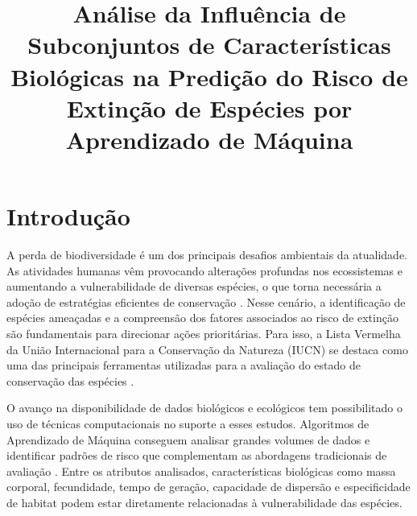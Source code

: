 \documentclass[conference]{IEEEtran}
\begin{document}
\title{Análise da Influência de Subconjuntos de Características Biológicas na Predição do Risco de Extinção de Espécies por Aprendizado de Máquina}

\author{
}

\maketitle



\section{Introdução}

A perda de biodiversidade é um dos principais desafios ambientais da atualidade. As atividades humanas vêm provocando alterações profundas nos ecossistemas e aumentando a vulnerabilidade de diversas espécies, o que torna necessária a adoção de estratégias eficientes de conservação \cite{b1}. Nesse cenário, a identificação de espécies ameaçadas e a compreensão dos fatores associados ao risco de extinção são fundamentais para direcionar ações prioritárias. Para isso, a Lista Vermelha da União Internacional para a Conservação da Natureza (IUCN) se destaca como uma das principais ferramentas utilizadas para a avaliação do estado de conservação das espécies \cite{b2}.

O avanço na disponibilidade de dados biológicos e ecológicos tem possibilitado o uso de técnicas computacionais no suporte a esses estudos. Algoritmos de Aprendizado de Máquina conseguem analisar grandes volumes de dados e identificar padrões de risco que complementam as abordagens tradicionais de avaliação \cite{b3}. Entre os atributos analisados, características biológicas como massa corporal, fecundidade, tempo de geração, capacidade de dispersão e especificidade de habitat podem estar diretamente relacionadas à vulnerabilidade das espécies.
\end{document}
